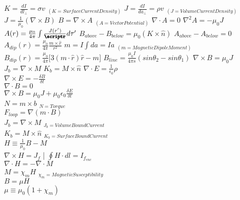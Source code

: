\documentclass[1pt]{report}
\begin{document}
\begin{multicols}{3}
\begin{flushleft}
\linebreak
$K=\frac{dI}{dl_\perp}=\sigma v$ $_{(K=Surface Current Density)}$
\linebreak
$J=\frac{dI}{da_\perp}=\rho v$ $_{(J=Volume Current Density)}$
\linebreak
$J=\frac{1}{\mu_0}(\nabla\times B)$
\linebreak
$B=\nabla\times A$ $_{(A=Vector Potential)}$
\linebreak
$\nabla\cdot A=0$
\linebreak
$\nabla^2A=-\mu_0J$
\linebreak
$A(r)=\frac{\mu_0}{4\pi}\int\frac{J(r')}{{\pmb{\scriptr}}}d\tau'$
\linebreak
$B_{above}-B_{below}=\mu_0(K\times\hat{n})$
\linebreak
$A_{above}-A_{below}=0$
\linebreak
$A_{dip}(r)=\frac{\mu_0}{4\pi}\frac{m\times\hat{r}}{r^2}$
\linebreak
$m=I\int da=Ia$ $_{(m=Magnetic Dipole Moment)}$
\linebreak
$B_{dip}(r)=\frac{\mu_0}{4\pi}\lbrack 3(m\cdot\hat{r})\hat{r}-m\rbrack$
\linebreak
$B_{line}=\frac{\mu_0I}{4\pi s}(sin\theta_2-sin\theta_1)$
\linebreak
$\nabla\times B=\mu_0J$
\linebreak
$J_b=\nabla\times M$
\linebreak
$K_b=M\times\hat{n}$
$\nabla\cdot E=\frac{1}{\epsilon_0}\rho$\\
$\nabla\times E=-\frac{\delta B}{\delta t}$\\
$\nabla\cdot B=0$\\
$\nabla\times B=\mu_0J+\mu_0\epsilon_0\frac{\delta E}{\delta t}$\\

$N=m\times b$ $_{N=Torque}$\\
$F_{loop}=\nabla(m\cdot B)$\\
$J_b=\nabla\times M$ $_{J_b=VolumeBoundCurrent}$\\
$K_b=M\times\hat{n}$ $_{K_b=SurfaceBoundCurrent}$\\
$H\equiv\frac{1}{\mu_0}B-M$\\
$\nabla\times H=J_f$ | $\oint H\cdot dl=I_{f_{enc}}$\\
$\nabla\cdot H=-\nabla\cdot M$\\
$M=\chi_m H$ $_{\chi_m=MagneticSusceptibility}$\\
$B=\mu H$\\
$\mu\equiv\mu_0 (1+\chi_m)$\\


\end{flushleft}
\end{multicols}
\end{document}
